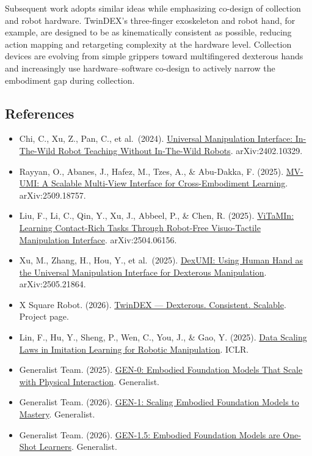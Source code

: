 Subsequent work adopts similar ideas while emphasizing co-design of collection and robot hardware. TwinDEX's three-finger exoskeleton and robot hand, for example, are designed to be as kinematically consistent as possible, reducing action mapping and retargeting complexity at the hardware level. Collection devices are evolving from simple grippers toward multifingered dexterous hands and increasingly use hardware--software co-design to actively narrow the embodiment gap during collection.

\FloatBarrier
{}
\hypertarget{references-163}{%
\subsection{References}\label{references-163}}

\vspace{0.25em}
\begin{itemize}
\tightlist
\item
  Chi, C., Xu, Z., Pan, C., et al.~(2024). \href{https://arxiv.org/abs/2402.10329}{Universal Manipulation Interface: In-The-Wild Robot Teaching Without In-The-Wild Robots}. arXiv:2402.10329.
\item
  Rayyan, O., Abanes, J., Hafez, M., Tzes, A., \& Abu-Dakka, F. (2025). \href{https://arxiv.org/abs/2509.18757}{MV-UMI: A Scalable Multi-View Interface for Cross-Embodiment Learning}. arXiv:2509.18757.
\item
  Liu, F., Li, C., Qin, Y., Xu, J., Abbeel, P., \& Chen, R. (2025). \href{https://arxiv.org/abs/2504.06156}{ViTaMIn: Learning Contact-Rich Tasks Through Robot-Free Visuo-Tactile Manipulation Interface}. arXiv:2504.06156.
\item
  Xu, M., Zhang, H., Hou, Y., et al.~(2025). \href{https://arxiv.org/abs/2505.21864}{DexUMI: Using Human Hand as the Universal Manipulation Interface for Dexterous Manipulation}. arXiv:2505.21864.
\item
  X Square Robot. (2026). \href{https://x2robot.com/en/pages/twindex}{TwinDEX --- Dexterous. Consistent. Scalable}. Project page.
\item
  Lin, F., Hu, Y., Sheng, P., Wen, C., You, J., \& Gao, Y. (2025). \href{https://proceedings.iclr.cc/paper_files/paper/2025/hash/88b7b2c896506daabc8d3fd587055167-Abstract-Conference.html}{Data Scaling Laws in Imitation Learning for Robotic Manipulation}. ICLR.
\item
  Generalist Team. (2025). \href{https://generalistai.com/blog/gen-0}{GEN-0: Embodied Foundation Models That Scale with Physical Interaction}. Generalist.
\item
  Generalist Team. (2026). \href{https://generalistai.com/blog/gen-1}{GEN-1: Scaling Embodied Foundation Models to Mastery}. Generalist.
\item
  Generalist Team. (2026). \href{https://generalistai.com/blog/gen-1.5}{GEN-1.5: Embodied Foundation Models are One-Shot Learners}. Generalist.
\end{itemize}

\clearpage
